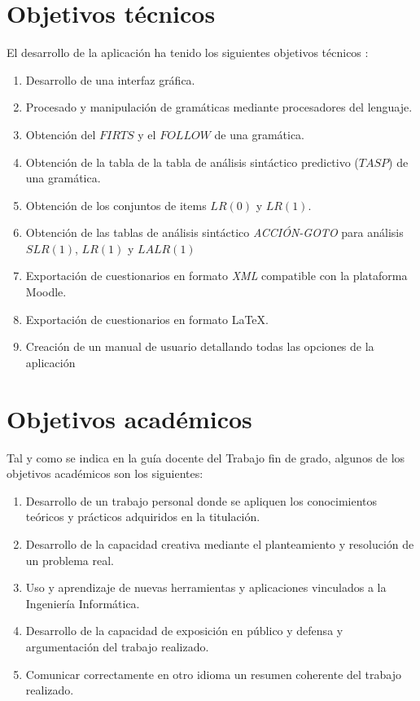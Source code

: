 
\section{Objetivos técnicos}

El desarrollo de la aplicación ha tenido los siguientes objetivos técnicos :
\begin{enumerate}
	\item Desarrollo de una interfaz gráfica.
	\item Procesado y manipulación de gramáticas mediante procesadores del lenguaje.
	\item Obtención del $FIRTS$ y el $FOLLOW$ de una gramática.
	\item Obtención de la tabla de la tabla de análisis sintáctico predictivo ($TASP$) de una gramática.
	\item Obtención de los conjuntos de items $LR(0)$ y  $LR(1)$.
	\item Obtención de las tablas de análisis sintáctico  \textit{ACCIÓN-GOTO} para análisis $SLR(1)$, $LR(1)$ y $LALR(1)$
	\item Exportación de cuestionarios en formato \textit{XML} compatible con la plataforma Moodle.
	
	\item Exportación de cuestionarios en formato \LaTeX{}.
	
	\item Creación de un manual de usuario detallando todas las opciones de la aplicación
\end{enumerate}

\section{Objetivos académicos}
Tal y como se indica en la guía docente del Trabajo fin de grado, algunos de los objetivos académicos son los siguientes:
\begin{enumerate}
	
	\item Desarrollo de un trabajo personal donde se 	apliquen los conocimientos teóricos y prácticos adquiridos en la titulación.
	\item Desarrollo de  la capacidad creativa mediante el planteamiento y resolución de un problema real.
	
	\item Uso y aprendizaje de nuevas herramientas y aplicaciones vinculados a la Ingeniería Informática.

	\item Desarrollo de la capacidad de exposición en público y  defensa y argumentación del trabajo realizado.
	\item Comunicar correctamente en otro idioma un resumen coherente del trabajo realizado.

\end{enumerate}

